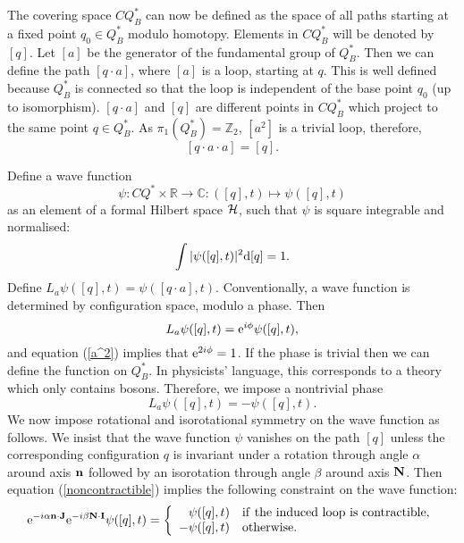\documentclass[a4paper,12pt]{article}
\begin{document}
The covering space $CQ_B^*$ can now be defined as the space of all 
paths starting at a fixed point $q_0 \in Q_B^*$ modulo 
homotopy. Elements in $CQ_B^*$ will be denoted by $[q]$. Let $[a]$ 
be the generator of the fundamental group of $Q_B^*$. 
Then we can define the 
path $[q \cdot a]$, where $[a]$ is a loop, starting at $q$. 
This is well defined because $Q_B^*$ is connected so that the loop is 
independent of the base point $q_0$ (up to isomorphism). 
$[q \cdot a]$ and $[q]$ are different points in $CQ_B^*$ which 
project  to the same point $q \in Q_B^*$.
 As $\pi_1(Q_B^*) = {\mathbb Z}_2$, $[a^2]$ is a trivial loop, 
therefore, 
%
\begin{equation}
\label{a^2}
[q\cdot a \cdot a] = [q].  
\end{equation}

Define a wave function 
\begin{equation}
\psi: CQ^* \times {\mathbb R} \to {\mathbb C}: 
([q],t) \mapsto \psi([q],t) 
\end{equation}
%
as an element of a formal Hilbert space ${\cal H}$, such that 
$\psi$ is square integrable and normalised:
%
\begin{equation}
\int |\psi([q],t)|^2 {\rm d} [q] = 1.  
\end{equation}
%
Define $L_a \psi([q],t) = \psi([q\cdot a], t)$. 
Conventionally, a wave function is determined by configuration 
space, modulo a phase. Then
%
\begin{equation}
L_a \psi([q],t) = {\rm e}^{i \phi} \psi([q],t),
\end{equation}
%
and equation (\ref{a^2}) implies that ${\rm e}^{2i \phi} = 1$.
If the phase is trivial then we can define the function on 
$Q_B^*$. In physicists' language, this corresponds to a theory which 
only contains bosons. Therefore, we impose a nontrivial phase
%
\begin{equation}
\label{noncontractible}
L_a \psi([q],t) = - \psi([q],t).
\end{equation}
%
We now impose rotational and isorotational symmetry on the wave 
function as follows. We insist that
the wave function $\psi$ vanishes on the path 
$[q]$ unless the corresponding configuration $q$ is  
invariant under a rotation through angle $\alpha$ around axis 
${\bf n}$ followed by an isorotation through angle $\beta$ around 
axis ${\bf N}$. Then equation (\ref{noncontractible}) implies the 
following constraint on the wave function:
%
\begin{equation}
\label{FR}
{\rm e}^{-i \alpha {\bf n} \cdot {\bf J}}
{\rm e}^{-i \beta {\bf N} \cdot {\bf I}}
\psi([q],t) 
= \left\{ 
\begin{array}{r l}
\psi([q],t) & {\rm if\ the\ induced\ loop\ is\ 
contractible,} \\
- \psi([q],t)      & {\rm otherwise.} 
\end{array}
\right.
\end{equation}
\end{document}
